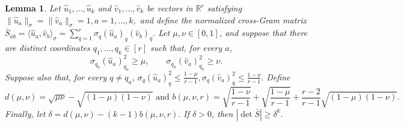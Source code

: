 \documentclass[11pt, preprint]{article}
\newtheorem{lemma}[theorem]{Lemma}
\newcommand{\R}{\mathbb{R}}
\newcommand{\inner}[1]{\langle #1\rangle}
\begin{document}
\begin{lemma}\label{lem:denom_lower_bound}
Let $\widehat u_1,\ldots,\widehat u_k$ and
$\widehat v_1,\ldots,\widehat v_k$ be vectors in $\R^r$ satisfying
\(
    \|\widehat u_a\|_\sigma
    =
    \|\widehat v_a\|_\sigma
    =
    1,
     a=1,\ldots,k,
\)
and define the normalized cross-Gram matrix
\(
    \bar S_{ab}
    =
    \inner{\widehat u_a,\widehat v_b}_\sigma
    =
    \sum_{q=1}^r
    \sigma_q(\widehat u_a)_q(\widehat v_b)_q.
\)
Let $\mu,\nu\in[0,1]$, and suppose that there are distinct coordinates
$q_1,\ldots,q_k\in[r]$ such that, for every $a$,
\[
    \sigma_{q_a}(\widehat u_a)_{q_a}^2
    \geq \mu,
    \qquad
    \sigma_{q_a}(\widehat v_a)_{q_a}^2
    \geq \nu.
\]
Suppose also that, for every $q\neq q_a$,
\(\sigma_q(\widehat u_a)_q^2  \leq  \frac{1-\mu}{r-1},    \sigma_q(\widehat v_a)_q^2 \leq\frac{1-\nu}{r-1}.\)
Define
\[
    d(\mu,\nu)
    =
    \sqrt{\mu\nu}
    -
    \sqrt{(1-\mu)(1-\nu)}
\text{~and~}
    b(\mu,\nu,r)
    =
    \sqrt{\frac{1-\nu}{r-1}}
    +
    \sqrt{\frac{1-\mu}{r-1}} +
    \frac{r-2}{r-1}
    \sqrt{(1-\mu)(1-\nu)}.
\]
Finally, let
\(
    \delta
    =
    d(\mu,\nu)
    -
    (k-1)b(\mu,\nu,r).
\)
If $\delta>0$, then \(|\det\bar S|\geq\delta^k.\)
\end{lemma}
\end{document}

